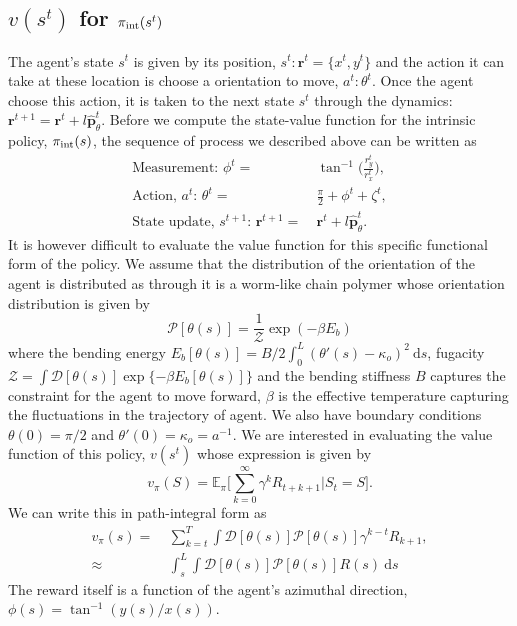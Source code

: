 \documentclass[12pt]{article}
\def\d{\text{d}}
\def\r{\mathbf{r}}
\def\E{\mathbb{E}}
\def\ph{\hat{\mathbf{p}}}
\def\P{\mathcal{P}}
\def\D{\mathcal{D}}
\begin{document}
\subsection{$v(s^t)$ for $\pi_{\rm int}(s^t)$}
The agent's state $s^t$ is given by its position, $s^t: \r^t=\{ x^t, y^t \}$ and the action it can take
at these location is choose a orientation to move, $a^t: \theta^t$. Once the agent choose this action,
it is taken to the next state $s^t$ through the dynamics: $\r^{t+1} = \r^t + l \ph_\theta^{t}$.
Before we compute the state-value function for the intrinsic policy, $\pi_{\rm int}(s)$, the sequence
of process we described above can be written as
\begin{align}
    \text{Measurement: } \phi^{t} = & \ \tan^{-1} \bigg( \frac{r_y^t}{r_x^t} \bigg), \\
    \text{Action, $a^t$: }\theta^{t} =& \ \frac{\pi}{2} + \phi^{t} + \zeta^t, \\
    \text{State update, $s^{t+1}$: } \r^{t+1} =& \ \r^t + l \ph_\theta^{t}.
\end{align}
It is however difficult to evaluate the value function for this specific functional form of the policy.
We assume that the distribution of the orientation of the agent is distributed as through
it is a worm-like chain polymer whose orientation distribution is given by
\[
    \P[\theta(s)] = \frac{1}{\mathcal{Z}}\exp{(-\beta E_b)}
\]
where the bending energy $E_b[\theta(s)] = B/2 \int_0^L (\theta'(s)-\kappa_o)^2 \ \d s$, fugacity
$\mathcal{Z} = \int \mathcal{D}[\theta(s)] \exp\{ {-\beta E_b[\theta(s)]} \}$ and the bending
stiffness $B$ captures the constraint for the agent to move forward, $\beta$ is the effective
temperature capturing the fluctuations in the trajectory of agent. We also have
boundary conditions $\theta(0) = \pi/2$ and $\theta'(0) = \kappa_o = a^{-1}$. 
We are interested in evaluating the value function of this policy, $v(s^t)$ whose
expression is given by
\[
    v_\pi(S) = \E_\pi \bigg[ \sum_{k=0}^\infty \gamma^k R_{t+k+1} \bigg| S_t = S \bigg].
\]
We can write this in path-integral form as
\begin{align}
    v_\pi(s) =& \ \sum_{k=t}^T \int \D[\theta(s)] \P[\theta(s)] \gamma^{k-t} R_{k+1}, \\
    \approx& \ \int_{s}^L \int \D[\theta(s)] \P[\theta(s)] R(s) \ \d s
\end{align}
The reward itself is a function of the agent's azimuthal direction, $\phi(s) = \tan^{-1}(y(s)/x(s))$.
\end{document}
